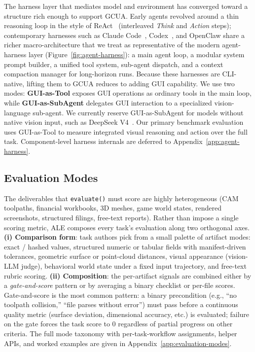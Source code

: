 \documentclass{llmxive}
\begin{document}
The harness layer that mediates model and environment has converged toward a structure rich enough to support GCUA. Early agents revolved around a thin reasoning loop in the style of ReAct~\citep{yao2023react} (interleaved \textit{Think} and \textit{Action} steps); contemporary harnesses such as Claude Code~\citep{anthropic2025claudecode}, Codex~\citep{openai2025codex}, and OpenClaw share a richer macro-architecture that we treat as representative of the modern agent-harness layer (Figure~\ref{fig:agent-harness}): a main agent loop, a modular system prompt builder, a unified tool system, sub-agent dispatch, and a context compaction manager for long-horizon runs. Because these harnesses are CLI-native, lifting them to GCUA reduces to adding GUI capability. We use two modes: \textbf{GUI-as-Tool} exposes GUI operations as ordinary tools in the main loop, while \textbf{GUI-as-SubAgent} delegates GUI interaction to a specialized vision-language sub-agent. We currently reserve GUI-as-SubAgent for models without native vision input, such as DeepSeek V4~\citep{deepseek2026v4pro}. Our primary benchmark evaluation uses GUI-as-Tool to measure integrated visual reasoning and action over the full task. Component-level harness internals are deferred to Appendix~\ref{app:agent-harness}.

\vspace{-0.6em}
\subsection{Evaluation Modes}
\label{sec:evaluation-modes}
\vspace{-0.4em}
The deliverables that \texttt{evaluate()} must score are highly heterogeneous (CAM toolpaths, financial workbooks, 3D meshes, game world states, rendered screenshots, structured filings, free-text reports). Rather than impose a single scoring metric, ALE composes every task's evaluation along two orthogonal axes. \textbf{(i) Comparison form}: task authors pick from a small palette of artifact modes: exact / hashed values, structured numeric or tabular fields with manifest-driven tolerances, geometric surface or point-cloud distances, visual appearance (vision-LLM judge), behavioral world state under a fixed input trajectory, and free-text rubric scoring. \textbf{(ii) Composition}: the per-artifact signals are combined either by a \emph{gate-and-score} pattern or by averaging a binary checklist or per-file scores. Gate-and-score is the most common pattern: a binary precondition (e.g., ``no toolpath collision,'' ``file parses without error'') must pass before a continuous quality metric (surface deviation, dimensional accuracy, etc.) is evaluated; failure on the gate forces the task score to $0$ regardless of partial progress on other criteria. The full mode taxonomy with per-task-workflow assignments, helper APIs, and worked examples are given in Appendix~\ref{app:evaluation-modes}.
\end{document}
